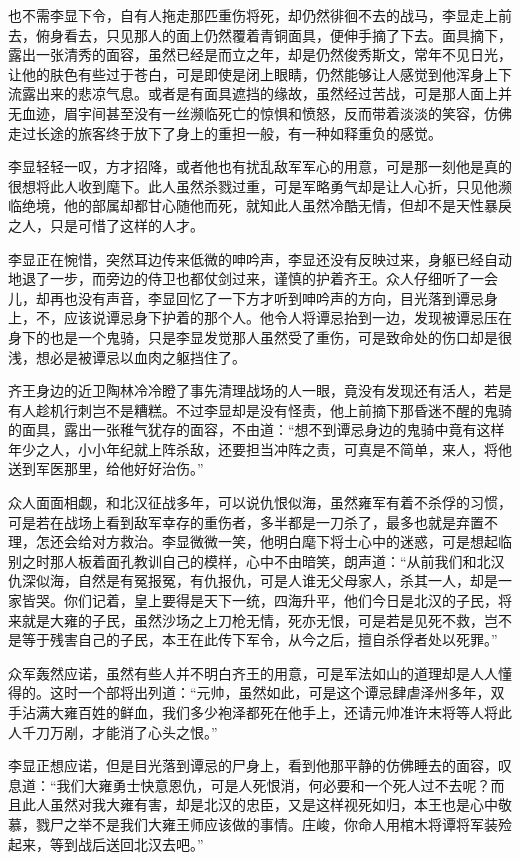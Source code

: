 也不需李显下令，自有人拖走那匹重伤将死，却仍然徘徊不去的战马，李显走上前去，俯身看去，只见那人的面上仍然覆着青铜面具，便伸手摘了下去。面具摘下，露出一张清秀的面容，虽然已经是而立之年，却是仍然俊秀斯文，常年不见日光，让他的肤色有些过于苍白，可是即使是闭上眼睛，仍然能够让人感觉到他浑身上下流露出来的悲凉气息。或者是有面具遮挡的缘故，虽然经过苦战，可是那人面上并无血迹，眉宇间甚至没有一丝濒临死亡的惊惧和愤怒，反而带着淡淡的笑容，仿佛走过长途的旅客终于放下了身上的重担一般，有一种如释重负的感觉。

李显轻轻一叹，方才招降，或者他也有扰乱敌军军心的用意，可是那一刻他是真的很想将此人收到麾下。此人虽然杀戮过重，可是军略勇气却是让人心折，只见他濒临绝境，他的部属却都甘心随他而死，就知此人虽然冷酷无情，但却不是天性暴戾之人，只是可惜了这样的人才。

李显正在惋惜，突然耳边传来低微的呻吟声，李显还没有反映过来，身躯已经自动地退了一步，而旁边的侍卫也都仗剑过来，谨慎的护着齐王。众人仔细听了一会儿，却再也没有声音，李显回忆了一下方才听到呻吟声的方向，目光落到谭忌身上，不，应该说谭忌身下护着的那个人。他令人将谭忌抬到一边，发现被谭忌压在身下的也是一个鬼骑，只是李显发觉那人虽然受了重伤，可是致命处的伤口却是很浅，想必是被谭忌以血肉之躯挡住了。

齐王身边的近卫陶林冷冷瞪了事先清理战场的人一眼，竟没有发现还有活人，若是有人趁机行刺岂不是糟糕。不过李显却是没有怪责，他上前摘下那昏迷不醒的鬼骑的面具，露出一张稚气犹存的面容，不由道：“想不到谭忌身边的鬼骑中竟有这样年少之人，小小年纪就上阵杀敌，还要担当冲阵之责，可真是不简单，来人，将他送到军医那里，给他好好治伤。”

众人面面相觑，和北汉征战多年，可以说仇恨似海，虽然雍军有着不杀俘的习惯，可是若在战场上看到敌军幸存的重伤者，多半都是一刀杀了，最多也就是弃置不理，怎还会给对方救治。李显微微一笑，他明白麾下将士心中的迷惑，可是想起临别之时那人板着面孔教训自己的模样，心中不由暗笑，朗声道：“从前我们和北汉仇深似海，自然是有冤报冤，有仇报仇，可是人谁无父母家人，杀其一人，却是一家皆哭。你们记着，皇上要得是天下一统，四海升平，他们今日是北汉的子民，将来就是大雍的子民，虽然沙场之上刀枪无情，死亦无恨，可是若是见死不救，岂不是等于残害自己的子民，本王在此传下军令，从今之后，擅自杀俘者处以死罪。”

众军轰然应诺，虽然有些人并不明白齐王的用意，可是军法如山的道理却是人人懂得的。这时一个部将出列道：“元帅，虽然如此，可是这个谭忌肆虐泽州多年，双手沾满大雍百姓的鲜血，我们多少袍泽都死在他手上，还请元帅准许末将等人将此人千刀万剐，才能消了心头之恨。”

李显正想应诺，但是目光落到谭忌的尸身上，看到他那平静的仿佛睡去的面容，叹息道：“我们大雍勇士快意恩仇，可是人死恨消，何必要和一个死人过不去呢？而且此人虽然对我大雍有害，却是北汉的忠臣，又是这样视死如归，本王也是心中敬慕，戮尸之举不是我们大雍王师应该做的事情。庄峻，你命人用棺木将谭将军装殓起来，等到战后送回北汉去吧。”

